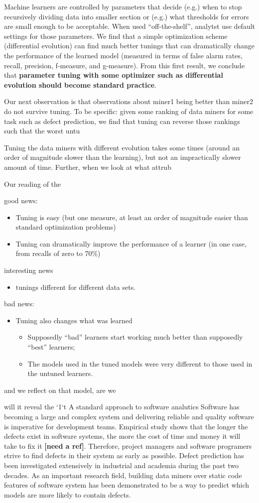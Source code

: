 \documentclass{sig-alternative}
\newcommand{\bi}{\begin{itemize}[leftmargin=0.4cm]}
\newcommand{\ei}{\end{itemize}}
\begin{document}
Machine learners
are controlled by parameters that decide (e.g.) when to stop recursively
dividing data into smaller section or (e.g.) what thresholds for errors are small
enough to be acceptable. When used ``off-the-shelf'', analytst
use default settings for those parameters. We find that  a 
simple optimization scheme (differential evolution) can find much
better tunings that can dramatically change the performance of
the learned model (measured in terms of false alarm rates, recall,
precision, f-measure, and g-measure).  From this first result,
we conclude that {\bf parameter tuning with some optimizer such as differential
evolution should become standard practice}.

Our next observation is that observations about miner1 being better
than miner2 do not survive tuning. To be specific: given some
ranking of data miners for some task such as defect prediction,
we find that tuning can reverse those rankings such that the worst untu


Tuning the data miners with different evolution takes some
times (around an order of magnitude slower than the learning), but not an impractically slower amount of time. Further, when we look at what
attrub


Our reading of the 

good news:
\bi 
\item Tuning is easy (but one measure, at least an order of magnitude easier than 
standard optimization problems)
\item Tuning can dramatically improve the performance of a learner (in one case, from recalls
of zero to 70\%)
\ei
interesting news
\bi 
\item tunings different for different data sets.
\ei 
bad news:
\bi
\item Tuning also changes what was learned
\bi
\item Supposedly ``bad'' learners start working much better than supposedly ``best'' learners;
\item The models used in the tuned models were very different to those used in the untuned learners.
\ei 
\ei 
and we reflect on that model, are we 

will it reveal the `1`t
A standard approach to software analutics
Software has becoming a large and complex system and delivering reliable and quality 
software is imperative for development teams. Empirical study shows that the longer the 
defects exist in software systems, the more the cost of time and money it will take to fix it 
\textbf{ [need a ref]}. Therefore, project managers and software programers strive to find 
defects in their system as early as possible. Defect prediction has been investigated 
extensively in industrial and academia during the past two decades. As an important research 
field, building data miners  \cite{lessmann2008benchmarking, mccabe1976complexity, 
menzies2007data, menzies2010defect, jiang2008can, menzies2011local, song2011general} 
over static code features of software system has been demonstrated to be a way to predict 
which models are more likely to contain defects.
\end{document}
